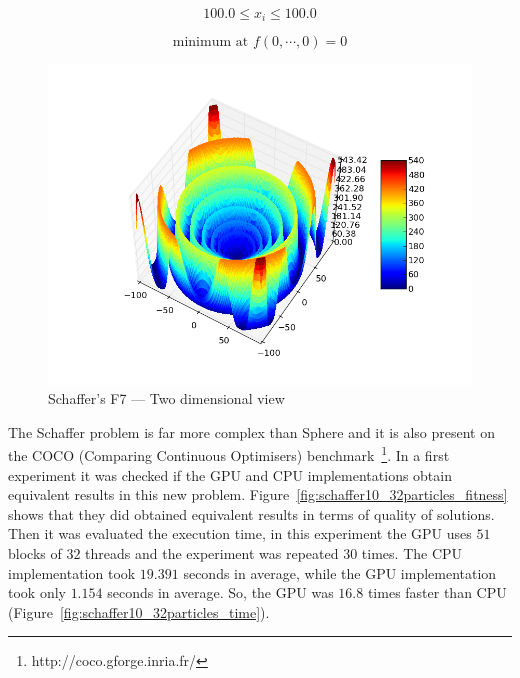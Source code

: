 \documentclass{article}
\begin{document}
    \begin{equation}
            100.0 \leq x_i \leq 100.0
    \end{equation}

    \begin{equation}
        \text{minimum at }f(0, \cdots, 0) = 0
    \end{equation}

     \begin{figure}[!htb]
        \centering
        \includegraphics[width=.7\textwidth]{../img/schafferf7.png}
        \caption{Schaffer's F7 --- Two dimensional view}
        \label{fig:schaffer}
    \end{figure}

    The Schaffer problem is far more complex than Sphere and it is also present on the COCO (Comparing Continuous Optimisers) benchmark~\footnote{http://coco.gforge.inria.fr/}.
    In a first experiment it was checked if the GPU and CPU implementations obtain equivalent results in this new problem. Figure~\ref{fig:schaffer10_32particles_fitness} shows that they did obtained equivalent results in terms of quality of solutions.
    Then it was evaluated the execution time, in this experiment the GPU uses $51$ blocks of $32$ threads and the experiment was repeated $30$ times. The CPU implementation took $19.391$ seconds in average, while the GPU implementation took only $1.154$ seconds in average. So, the GPU was $16.8$ times faster than CPU (Figure~\ref{fig:schaffer10_32particles_time}).
\end{document}
